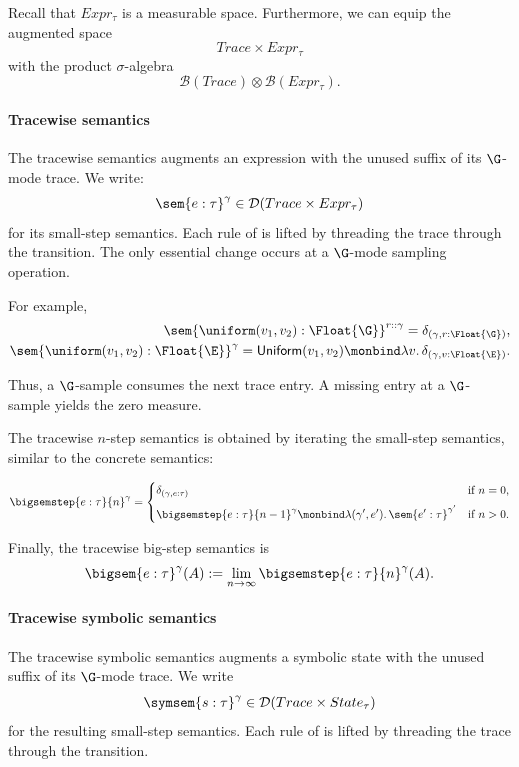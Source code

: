 Recall that $Expr_\tau$ is a measurable space. Furthermore, we can equip the augmented space
\[
  Trace\times Expr_\tau
\]
with the product \(\sigma\)-algebra
\[
  \mathcal B(Trace)\otimes\mathcal B(Expr_\tau).
\]

\paragraph{Tracewise semantics}
The tracewise semantics augments an expression with the unused suffix of its $\G$-mode trace. We write:
\[
  \sem{e : \tau}^\gamma
  \in
  \mathcal D(Trace\times Expr_\tau)
\]
for its small-step semantics. Each rule of
 is lifted by threading the trace through the
transition. The only essential change occurs at a $\G$-mode sampling operation. 

For example,
\begin{align*}
\sem{\uniform(v_1,v_2):\Float{\G}}^{r::\gamma}
=
\delta_{(\gamma,r:\Float{\G})},
\\
\sem{\uniform(v_1,v_2):\Float{\E}}^\gamma
=
\mathsf{Uniform}(v_1,v_2)
\monbind\lambda v.\,
\delta_{(\gamma,v:\Float{\E})}.
\end{align*}

Thus, a \(\G\)-sample consumes the next trace entry. A missing entry at a \(\G\)-sample yields the zero measure.

The tracewise $n$-step semantics is obtained by iterating the small-step semantics, similar to the concrete semantics:

\[
  \bigsemstep{e:\tau}{n}^{\gamma}
  =
  \begin{cases}
    \delta_{(\gamma,e:\tau)}
      & \text{if } n=0, \\[2mm]
    \displaystyle
    \bigsemstep{e:\tau}{n-1}^{\gamma}
    \monbind
    \lambda(\gamma',e').\,
    \sem{e':\tau}^{\gamma'}
      & \text{if } n>0.
  \end{cases}
\]

Finally, the tracewise big-step semantics is
\[
  \bigsem{e:\tau}^{\gamma}(A)
  :=
  \lim_{n\to\infty}
  \bigsemstep{e:\tau}{n}^{\gamma}(A).
\]

\paragraph{Tracewise symbolic semantics}
The tracewise symbolic semantics augments a symbolic state with the unused suffix of its $\G$-mode trace. We write
\[
  \symsem{s:\tau}^{\gamma}
  \in
  \mathcal D(Trace\times State_\tau)
\]for the resulting small-step semantics. Each rule of
 is lifted by threading the trace
through the transition.

